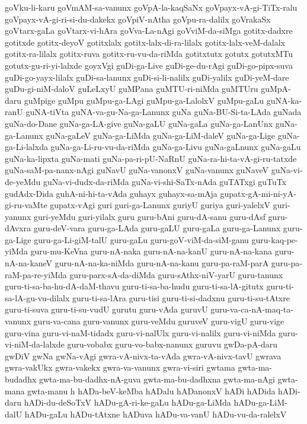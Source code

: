 {goVku-li-karu
goVmAM-sa-vanunx
goVpA-la-kaqSaNx
goVpayx-vA-gi-TiTx-ralu
goVpayx-vA-gi-ri-si-du-dakekx
goVpiV-nAtha
goVpu-ra-dalilx
goVrakaSx
goVtarx-gaLa
goVtarx-vi-hAra
goVva-La-nAgi
goVviM-da-siMga
gotitx-dadxre
gotitxde
gotitx-deyoV
gotitxlalx
gotitx-lalx-di-ra-lilalx
gotitx-lalx-veM-dalalx
gotitx-ra-lilalx
gotitx-ruva
gotitx-ru-vu-da-riMda
gotitxtutx
gotutx
gotutxMTu
gotutx-gu-ri-yi-lalxde
goyxVgi
guDi-ga-Live
guDi-ge-du-rAgi
guDi-go-pipx-suva
guDi-go-yayx-lilalx
guDi-sa-lanunx
guDi-si-li-nalilx
guDi-yalilx
guDi-yeM-dare
guDu-gi-niM-daloV
guLeLxyU
guMPana
guMTU-ri-niMda
guMTUru
guMpA-daru
guMpige
guMpu
guMpu-ga-LAgi
guMpu-ga-LalolxV
guMpu-gaLu
guNA-ka-ranU
guNA-tiVta
guNA-va-gu-Na-ga-Lanunx
guNa
guNa-BU-Si-ta-LAda
guNada
guNa-do-Dane
guNa-ga-LA-give
guNa-gaLU
guNa-gaLa
guNa-ga-LanUnx
guNa-ga-Lanunx
guNa-gaLeV
guNa-ga-LiMda
guNa-ga-LiM-daleV
guNa-ga-Lige
guNa-ga-Li-lalxda
guNa-ga-Li-ru-vu-da-riMda
guNa-ga-Livu
guNa-gaLnunx
guNa-gaLu
guNa-ka-lipxta
guNa-mati
guNa-pa-ri-pU-NaRnU
guNa-ra-hi-ta-vA-gi-ru-tatxde
guNa-saM-pa-nanx-nAgi
guNavU
guNa-vanonxV
guNa-vanunx
guNaveV
guNa-vi-de-yeMdu
guNa-vi-dudx-da-riMda
guNa-vi-shi-SaTx-nAda
guTATxgi
guTuTx
gudAdx-Dida
guhA-ni-hi-ta-vAda
guhayx
guhayx-sa-mAja
gupatx-gA-mi-ni-yA-gi-ru-vaMte
gupatx-vAgi
guri
guri-ga-Lanunx
guriyU
guriya
guri-yalelxV
guri-yanunx
guri-yeMdu
guri-yilalx
guru
guru-bAni
guru-dA-sanu
guru-dAsf
guru-dAvxra
guru-deV-vara
guru-ga-LAda
guru-gaLU
guru-gaLa
guru-ga-Lanunx
guru-ga-Lige
guru-ga-Li-giM-talU
guru-gaLu
guru-goV-viM-da-siM-ganu
guru-kaq-pe-yiMda
guru-mu-KeVna
guru-nA-naka
guru-nA-na-kanU
guru-nA-na-kana
guru-nA-na-kaneV
guru-nA-na-ka-niMda
guru-nA-na-kanu
guru-pa-raM-parA
guru-pa-raM-pa-re-yiMda
guru-parx-sA-da-diMda
guru-sAthx-niV-yarU
guru-tanunx
guru-ti-sa-ba-hu-dA-daM-thavu
guru-ti-sa-ba-hudu
guru-ti-sa-lA-gitutx
guru-ti-sa-lA-gu-vu-dilalx
guru-ti-sa-lAra
guru-tisi
guru-ti-si-dadxnu
guru-ti-su-tAtxre
guru-ti-suva
guru-ti-su-vudU
gurutu
guru-vAda
guruvU
guru-va-ca-nA-maq-ta-vanunx
guru-va-cana
guru-vanunx
guru-veMdu
guruveV
guru-vigU
guru-vige
guru-vina
guru-vi-naM-tidadx
guru-vi-nalUlx
guru-vi-nalilx
guru-vi-niMda
guru-vi-niM-da-lalxde
guru-vobabx
guru-vo-babx-nanunx
guruvu
gwDa-pA-daru
gwDiV
gwNa
gwNa-vAgi
gwra-vA-nivx-ta-vAda
gwra-vA-nivx-tavU
gwrava
gwra-vakUkx
gwra-vakekx
gwra-va-vanunx
gwra-vi-siri
gwtama
gwta-ma-budadhx
gwta-ma-bu-dadhx-nA-guva
gwta-ma-bu-dadhxna
gwta-ma-nAgi
gwta-mana
gwta-manu
h
hADa-beV-keMba
hADalu
hADanonxV
hADi
hADida
hADi-daru
hADi-du-deSoTxV
hADu-gA-ri-ke-gaLu
hADu-ga-LiMda
hADu-ga-LiM-dalU
hADu-gaLu
hADu-tAtxne
hADuva
hADu-va-vanU
hADu-vu-da-ralelxV
}
